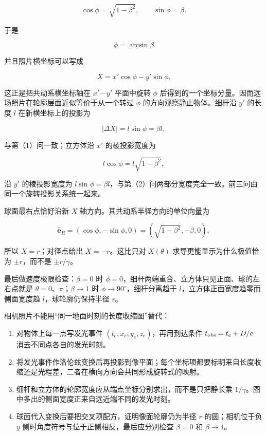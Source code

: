 \documentclass[12pt,a4paper,UTF8]{ctexart}
\newcommand{\tightlist}{\setlength{\itemsep}{0pt}\setlength{\parskip}{0pt}}
\begin{document}
\[\cos\phi=\sqrt{1-\beta^2},\qquad \sin\phi=\beta.\]

于是

\[\phi=\arcsin\beta\]

并且照片横坐标可以写成

\[X=x'\cos\phi-y'\sin\phi.\]

这正是把共动系横坐标轴在 \(x'\)---\(y'\) 平面中旋转 \(\phi\)
后得到的一个坐标分量。因而远场照片在轮廓层面近似等价于从一个转过
\(\phi\) 的方向观察静止物体。细杆沿 \(y'\) 的长度 \(l\)
在新横坐标上的投影为

\[|\Delta X|=l\sin\phi=\beta l,\]

与第（1）问一致；立方体沿 \(x'\) 的棱投影宽度为

\[l\cos\phi=l\sqrt{1-\beta^2},\]

沿 \(y'\) 的棱投影宽度为
\(l\sin\phi=\beta l\)，与第（2）问两部分宽度完全一致。前三问由同一个旋转投影关系统一起来。

球面最右点恰好沿新 \(X\) 轴方向。其共动系半径方向的单位向量为

\[\hat{\bm e}_R=(\cos\phi,-\sin\phi,0)
=(\sqrt{1-\beta^2},-\beta,0),\]

所以 \(X=r\)；对径点给出 \(X=-r\)。这比只对 \(X(\theta)\)
求导更能显示为什么极值恰为 \(\pm r\)，而不是 \(\pm r/\gamma\)。

最后做速度极限检查：\(\beta=0\) 时
\(\phi=0\)，细杆两端重合、立方体只见正面、球的左右点就是
\(\theta=0\)、\(\pi\)；\(\beta\to1\) 时
\(\phi\to90^\circ\)，细杆分离趋于 \(l\)，立方体正面宽度趋零而侧面宽度趋
\(l\)，球轮廓仍保持半径 \(r\)。

相机照片不能用``同一地面时刻的长度收缩图''替代：

\begin{enumerate}
\def\labelenumi{\arabic{enumi}.}
\tightlist
\item
  对物体上每一点写发光事件 \((t_e,x_e,y_e,z_e)\)，再用到达条件
  \(t_{\rm obs}=t_e+D/c\) 消去不同点各自的发光时刻。
\item
  将发光事件作洛伦兹变换后再投影到像平面；每个坐标项都要标明来自长度收缩还是光程差，二者在横向方向会共同形成旋转式的映射。
\item
  细杆和立方体的轮廓宽度应从端点坐标分别求出，而不是只把静长乘
  \(1/\gamma\)。图中多出的侧面宽度正来自远近端不同的发光时刻。
\item
  球面代入变换后要把交叉项配方，证明像面轮廓仍为半径 \(r\)
  的圆；相机位于负 \(y\) 侧时角度符号与位于正侧相反，最后应分别检查
  \(\beta=0\) 和 \(\beta\to1\)。
\end{enumerate}
\end{document}
